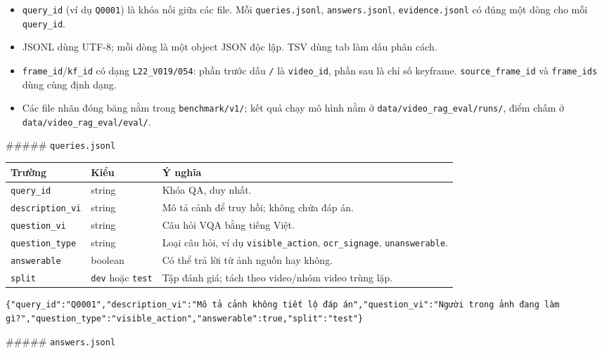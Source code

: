 \documentclass[12pt,a4paper,onecolumn]{article}
\begin{document}
\begin{itemize}
  \item \texttt{query\_id} (ví dụ \texttt{Q0001}) là khóa nối giữa các file. Mỗi \texttt{queries.jsonl}, \texttt{answers.jsonl}, \texttt{evidence.jsonl} có đúng một dòng cho mỗi \texttt{query\_id}.
  \item JSONL dùng UTF-8; mỗi dòng là một object JSON độc lập. TSV dùng tab làm dấu phân cách.
  \item \texttt{frame\_id}/\texttt{kf\_id} có dạng \texttt{L22\_V019/054}: phần trước dấu \texttt{/} là \texttt{video\_id}, phần sau là chỉ số keyframe. \texttt{source\_frame\_id} và \texttt{frame\_ids} dùng cùng định dạng.
  \item Các file nhãn đóng băng nằm trong \texttt{benchmark/v1/}; kết quả chạy mô hình nằm ở \texttt{data/video\_rag\_eval/runs/}, điểm chấm ở \texttt{data/video\_rag\_eval/eval/}.
\end{itemize}


\#\#\#\#\# \texttt{queries.jsonl}

\begin{center}
\begin{tabular}{l l l}
\toprule
Trường & Kiểu & Ý nghĩa \\
\midrule
\texttt{query\_id} & string & Khóa QA, duy nhất. \\
\texttt{description\_vi} & string & Mô tả cảnh để truy hồi; không chứa đáp án. \\
\texttt{question\_vi} & string & Câu hỏi VQA bằng tiếng Việt. \\
\texttt{question\_type} & string & Loại câu hỏi, ví dụ \texttt{visible\_action}, \texttt{ocr\_signage}, \texttt{unanswerable}. \\
\texttt{answerable} & boolean & Có thể trả lời từ ảnh nguồn hay không. \\
\texttt{split} & \texttt{dev} hoặc \texttt{test} & Tập đánh giá; tách theo video/nhóm video trùng lặp. \\
\bottomrule
\end{tabular}
\end{center}


\begin{lstlisting}[]
{"query_id":"Q0001","description_vi":"Mô tả cảnh không tiết lộ đáp án","question_vi":"Người trong ảnh đang làm gì?","question_type":"visible_action","answerable":true,"split":"test"}
\end{lstlisting}


\#\#\#\#\# \texttt{answers.jsonl}
\end{document}
